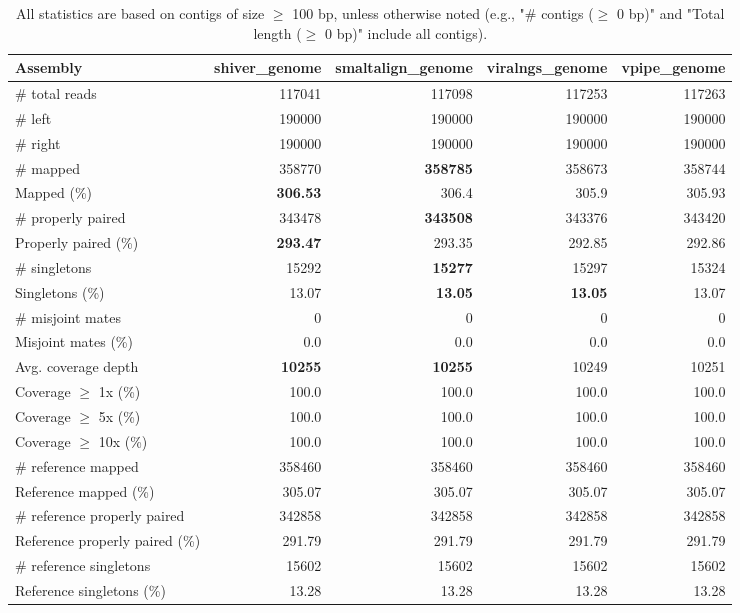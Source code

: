 \documentclass[12pt,a4paper]{article}
\begin{document}
\begin{table}[ht]
\begin{center}
\caption{All statistics are based on contigs of size $\geq$ 100 bp, unless otherwise noted (e.g., "\# contigs ($\geq$ 0 bp)" and "Total length ($\geq$ 0 bp)" include all contigs).}
\begin{tabular}{|l*{4}{|r}|}
\hline
Assembly & shiver\_genome & smaltalign\_genome & viralngs\_genome & vpipe\_genome \\ \hline
\# total reads & 117041 & 117098 & 117253 & 117263 \\ \hline
\# left & 190000 & 190000 & 190000 & 190000 \\ \hline
\# right & 190000 & 190000 & 190000 & 190000 \\ \hline
\# mapped & 358770 & {\bf 358785} & 358673 & 358744 \\ \hline
Mapped (\%) & {\bf 306.53} & 306.4 & 305.9 & 305.93 \\ \hline
\# properly paired & 343478 & {\bf 343508} & 343376 & 343420 \\ \hline
Properly paired (\%) & {\bf 293.47} & 293.35 & 292.85 & 292.86 \\ \hline
\# singletons & 15292 & {\bf 15277} & 15297 & 15324 \\ \hline
Singletons (\%) & 13.07 & {\bf 13.05} & {\bf 13.05} & 13.07 \\ \hline
\# misjoint mates & 0 & 0 & 0 & 0 \\ \hline
Misjoint mates (\%) & 0.0 & 0.0 & 0.0 & 0.0 \\ \hline
Avg. coverage depth & {\bf 10255} & {\bf 10255} & 10249 & 10251 \\ \hline
Coverage $\geq$ 1x (\%) & 100.0 & 100.0 & 100.0 & 100.0 \\ \hline
Coverage $\geq$ 5x (\%) & 100.0 & 100.0 & 100.0 & 100.0 \\ \hline
Coverage $\geq$ 10x (\%) & 100.0 & 100.0 & 100.0 & 100.0 \\ \hline
\# reference mapped & 358460 & 358460 & 358460 & 358460 \\ \hline
Reference mapped (\%) & 305.07 & 305.07 & 305.07 & 305.07 \\ \hline
\# reference properly paired & 342858 & 342858 & 342858 & 342858 \\ \hline
Reference properly paired (\%) & 291.79 & 291.79 & 291.79 & 291.79 \\ \hline
\# reference singletons & 15602 & 15602 & 15602 & 15602 \\ \hline
Reference singletons (\%) & 13.28 & 13.28 & 13.28 & 13.28 \\ \hline

\end{tabular}
\end{center}
\end{table}
\end{document}
